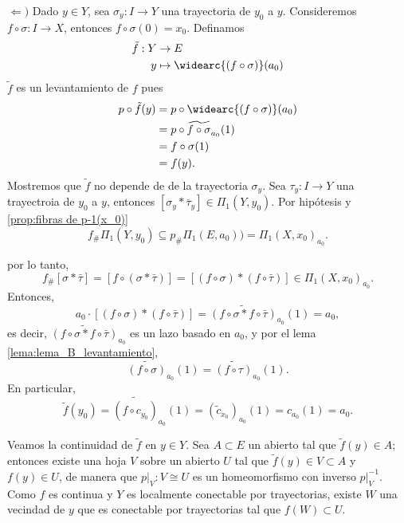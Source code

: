 \begin{dem}
    $\Leftarrow)$ Dado $y\in Y$, sea $\sigma_y:I\to Y$ una trayectoria de $y_0$ a $y.$ Consideremos $f\circ\sigma:I\to X$, entonces $f\circ\sigma(0)=x_0$. Definamos 
    \begin{align*}
        \tilde{f}:Y&\to E\\
        y&\mapsto \widearc{(f\circ\sigma)}(a_0)
    \end{align*}
    $\tilde{f}$ es un levantamiento de $f$ pues 
    \begin{align*}
        p\circ \tilde{f}(y)&=p\circ \widearc{(f\circ\sigma)}(a_0)\\
        &=p\circ \widetilde{f\circ \sigma}_{a_0}(1)\\
        &=f\circ \sigma(1)\\
        &=f(y).
    \end{align*}
    Mostremos que $\tilde{f}$ no depende de de la trayectoria $\sigma_y$. Sea $\tau_y:I\to Y$ una trayectroia de $y_0$ a $y$, entonces $[\sigma_y*\overline{\tau}_y]\in \Pi_1(Y,y_0)$. Por hipótesis y \ref{prop:fibras de p-1(x_0)} 
    \begin{equation*}
        f_\#\Pi_1(Y,y_0)\subseteq p_\#\Pi_1(E,a_0))= \Pi_1(X,x_0)_{a_0}.
    \end{equation*}

    por lo tanto,
\[
f_{\#}[\sigma * \bar{\tau}] = [f \circ (\sigma * \bar{\tau})] = [(f \circ \sigma) * (f \circ \bar{\tau})] \in \Pi_1(X, x_0)_{a_0}.
\]
Entonces,
\[
a_0 \cdot [(f \circ \sigma) * (f \circ \bar{\tau})] = \widetilde{(f \circ \sigma * f \circ \bar{\tau})}_{a_0}(1) = a_0,
\]
es decir, $\widetilde{(f \circ \sigma * f \circ \bar{\tau})}_{a_0}$ es un lazo basado en $a_0$, y por el lema \ref{lema:lema_B_levantamiento},
\[
\widetilde{(f \circ \sigma)}_{a_0}(1) = \widetilde{(f \circ \tau)}_{a_0}(1).
\]
En particular,
\[
\tilde{f}(y_0) = \widetilde{(f \circ c_{y_0})}_{a_0}(1) = (\tilde{c}_{x_0})_{a_0}(1) = c_{a_0}(1) = a_0.
\]

 Veamos la continuidad de $\tilde{f}$ en $y \in Y$. Sea $A \subset E$ un abierto tal que $\tilde{f}(y) \in A$; entonces existe una hoja $V$ sobre un abierto $U$ tal que $\tilde{f}(y) \in V \subset A$ y $f(y) \in U$, de manera que $p|_V \colon V \cong U$ es un homeomorfismo con inverso $p|_V^{-1}$. Como $f$ es continua y $Y$ es localmente conectable por trayectorias, existe $W$ una vecindad de $y$ que es conectable por trayectorias tal que $f(W) \subset U$.


\end{dem}
